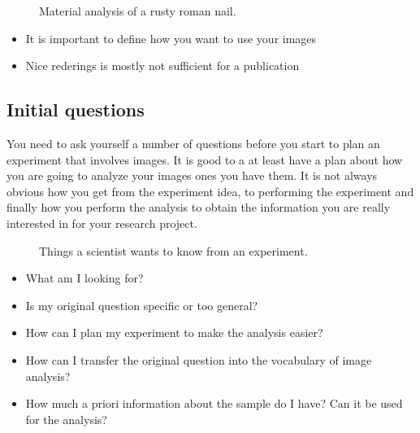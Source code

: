\documentclass[letterpaper,10pt,english]{sphinxmanual}
\begin{document}
\begin{figure}[htbp]
\centering
\capstart

\noindent{}
\caption{Material analysis of a rusty roman nail.}\label{\detokenize{01-Introduction:id21}}\end{figure}
\begin{itemize}
\item {} 
\sphinxAtStartPar
It is important to define how you want to use your images

\item {} 
\sphinxAtStartPar
Nice rederings is mostly not sufficient for a publication

\end{itemize}




\subsection{Initial questions}
\label{\detokenize{01-Introduction:initial-questions}}
\sphinxAtStartPar
You need to ask yourself a number of questions before you start to plan an experiment that involves images. It is good to a at least have a plan about how you are going to analyze your images ones you have them. It is not always obvious how you get from the experiment idea, to performing the experiment and finally how you perform the analysis to obtain the information you are really interested in for your research project.

\begin{figure}[htbp]
\centering
\capstart

\noindent{}
\caption{Things a scientist wants to know from an experiment.}\label{\detokenize{01-Introduction:id22}}\end{figure}
\begin{itemize}
\item {} 
\sphinxAtStartPar
What am I looking for?

\item {} 
\sphinxAtStartPar
Is my original question specific or too general?

\item {} 
\sphinxAtStartPar
How can I plan my experiment to make the analysis easier?

\item {} 
\sphinxAtStartPar
How can I transfer the original question into the vocabulary of image analysis?

\item {} 
\sphinxAtStartPar
How much a priori information about the sample do I have? Can it be used for the analysis?

\end{itemize}
\end{document}
